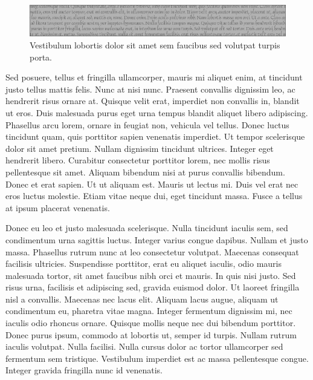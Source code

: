 \begin{figure}[!t]
  \centering
  \includegraphics[width=\linewidth]{figs/leaderboard-gray}
  \caption[Vestibulum lobortis]{
    Vestibulum lobortis dolor sit amet sem faucibus sed volutpat turpis porta.
  }
\end{figure}

Sed posuere, tellus et fringilla ullamcorper, mauris mi aliquet enim, at tincidunt justo tellus mattis felis.
Nunc at nisi nunc.
Praesent convallis dignissim leo, ac hendrerit risus ornare at.
Quisque velit erat, imperdiet non convallis in, blandit ut eros.
Duis malesuada purus eget urna tempus blandit aliquet libero adipiscing.
Phasellus arcu lorem, ornare in feugiat non, vehicula vel tellus.
Donec luctus tincidunt quam, quis porttitor sapien venenatis imperdiet.
Ut tempor scelerisque dolor sit amet pretium.
Nullam dignissim tincidunt ultrices.
Integer eget hendrerit libero.
Curabitur consectetur porttitor lorem, nec mollis risus pellentesque sit amet.
Aliquam bibendum nisi at purus convallis bibendum.
Donec et erat sapien.
Ut ut aliquam est.
Mauris ut lectus mi.
Duis vel erat nec eros luctus molestie.
Etiam vitae neque dui, eget tincidunt massa.
Fusce a tellus at ipsum placerat venenatis.

Donec eu leo et justo malesuada scelerisque.
Nulla tincidunt iaculis sem, sed condimentum urna sagittis luctus.
Integer varius congue dapibus.
Nullam et justo massa.
Phasellus rutrum nunc at leo consectetur volutpat.
Maecenas consequat facilisis ultricies.
Suspendisse porttitor, erat eu aliquet iaculis, odio mauris malesuada tortor, sit amet faucibus nibh orci et mauris.
In quis nisi justo.
Sed risus urna, facilisis et adipiscing sed, gravida euismod dolor.
Ut laoreet fringilla nisl a convallis.
Maecenas nec lacus elit.
Aliquam lacus augue, aliquam ut condimentum eu, pharetra vitae magna.
Integer fermentum dignissim mi, nec iaculis odio rhoncus ornare.
Quisque mollis neque nec dui bibendum porttitor.
Donec purus ipsum, commodo at lobortis ut, semper id turpis.
Nullam rutrum iaculis volutpat.
Nulla facilisi.
Nulla cursus dolor ac tortor ullamcorper sed fermentum sem tristique.
Vestibulum imperdiet est ac massa pellentesque congue.
Integer gravida fringilla nunc id venenatis.

